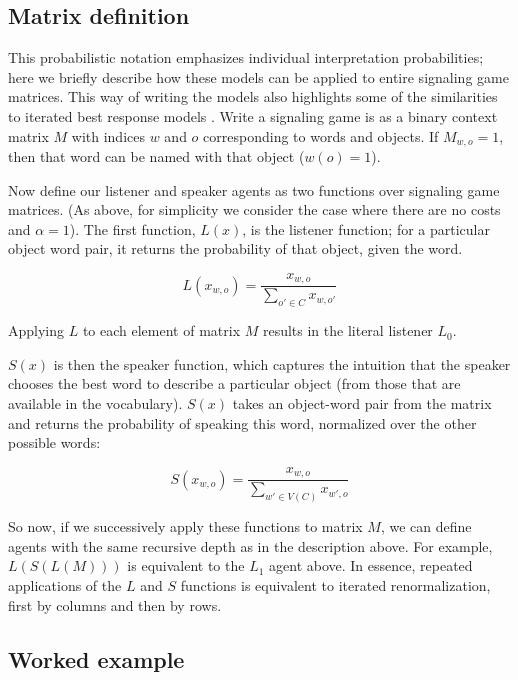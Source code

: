 \documentclass[man,noapacite]{apa2}
\begin{document}
\subsection{Matrix definition}

This probabilistic notation emphasizes individual interpretation probabilities; here we briefly describe how these models can be applied to entire signaling game matrices. This way of writing the models also highlights some of the similarities to iterated best response models \cite{jager2010}. Write a signaling game is as a binary context matrix $M$ with indices $w$ and $o$ corresponding to words and objects. If $M_{w,o} = 1$, then that word can be named with that object ($w(o) = 1$).

Now define our listener and speaker agents as two functions over signaling game matrices. (As above, for simplicity we consider the case where there are no costs and $\alpha=1$). The first function, $L(x)$, is the listener function; for a particular object word pair, it returns the probability of that object, given the word.

\begin{equation}
L(x_{w,o}) = \frac{x_{w,o}}{\displaystyle\sum_{o' \in C} x_{w,o'} }
\end{equation}

\noindent Applying $L$ to each element of matrix $M$ results in the literal listener $L_0$.

$S(x)$ is then the speaker function, which captures the intuition that the speaker chooses the best word to describe a particular object (from those that are available in the vocabulary). $S(x)$ takes an object-word pair from the matrix and returns the probability of speaking this word, normalized over the other possible words:

\begin{equation}
S(x_{w,o}) = \frac{x_{w,o}}{\displaystyle \sum_{w' \in V(C)} x_{w',o}}
\end{equation}

So now, if we successively apply these functions to matrix $M$, we can define agents with the same recursive depth as in the description above. For example, $L(S(L(M)))$ is equivalent to the $L_1$ agent above. In essence, repeated applications of the $L$ and $S$ functions is equivalent to iterated renormalization, first by columns and then by rows.

\subsection{Worked example}
\end{document}
